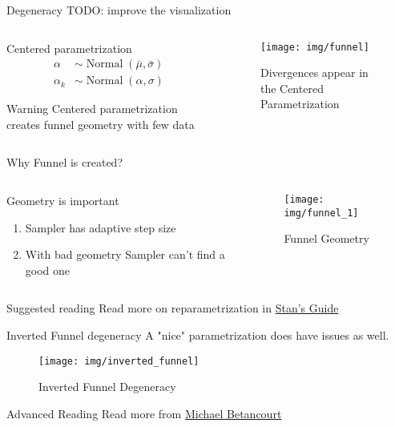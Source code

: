 \documentclass{beamer}
\begin{document}
\begin{frame}{Degeneracy}
TODO: improve the visualization
    \begin{columns}
    \begin{column}{0.5\linewidth}
    Centered parametrization
\begin{align*}
    \alpha &\sim \operatorname{Normal}(\bar\mu, \bar\sigma)\\
    \alpha_k &\sim \operatorname{Normal}(\alpha, \sigma)
\end{align*}
\begin{alertblock}{Warning}
Centered parametrization creates funnel geometry with few data
\end{alertblock}
    \end{column}
    \begin{column}{0.5\linewidth}
    \begin{figure}
        \centering
        \texttt{[image: img/funnel]}
        \caption{Divergences appear in the Centered Parametrization}
    \end{figure}
    \end{column}
    \end{columns}
\end{frame}
\begin{frame}{Why Funnel is created?}
    \begin{columns}
    \begin{column}{0.5\linewidth}
    Geometry is important
    \begin{enumerate}
        \item Sampler has adaptive step size
        \item With bad geometry Sampler can't find a good one
    \end{enumerate}
    \end{column}
    \begin{column}{0.5\linewidth}
    \begin{figure}
        \centering
        \texttt{[image: img/funnel\_1]}
        \caption{Funnel Geometry}
    \end{figure}
    \end{column}
    \end{columns}
\begin{block}{Suggested reading}
Read more on reparametrization in \href{https://mc-stan.org/docs/2_18/stan-users-guide/reparameterization-section.html}{Stan's Guide}
\end{block}
\end{frame}
\begin{frame}{Inverted Funnel degeneracy}
    A "nice" parametrization does have issues as well.
    \begin{figure}
        \centering
        \texttt{[image: img/inverted\_funnel]}
        \caption{Inverted Funnel Degeneracy}
    \end{figure}
\begin{alertblock}{Advanced Reading}
Read more from \href{https://betanalpha.github.io/assets/case_studies/hierarchical_modeling.html}{Michael Betancourt}
\end{alertblock}
\end{frame}
\end{document}
